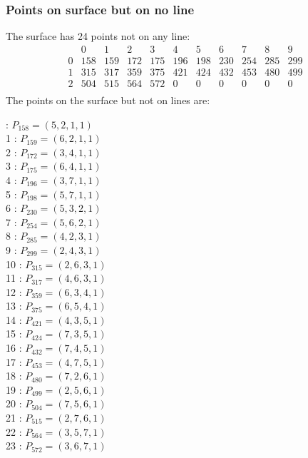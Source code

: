 \documentclass{article}
\begin{document}
{\subsubsection*{Points on surface but on no line}
The surface has 24 points not on any line:\\
$$
\begin{array}{r|*{10}{r}}
 & 0 & 1 & 2 & 3 & 4 & 5 & 6 & 7 & 8 & 9\\
\hline
0 & 158 & 159 & 172 & 175 & 196 & 198 & 230 & 254 & 285 & 299\\
1 & 315 & 317 & 359 & 375 & 421 & 424 & 432 & 453 & 480 & 499\\
2 & 504 & 515 & 564 & 572 & 0 & 0 & 0 & 0 & 0 & 0\\
\end{array}
$$
The points on the surface but not on lines are:\\
\begin{multicols}{2}
 : $P_{158}=( 5, 2, 1, 1 )$\\
1 : $P_{159}=( 6, 2, 1, 1 )$\\
2 : $P_{172}=( 3, 4, 1, 1 )$\\
3 : $P_{175}=( 6, 4, 1, 1 )$\\
4 : $P_{196}=( 3, 7, 1, 1 )$\\
5 : $P_{198}=( 5, 7, 1, 1 )$\\
6 : $P_{230}=( 5, 3, 2, 1 )$\\
7 : $P_{254}=( 5, 6, 2, 1 )$\\
8 : $P_{285}=( 4, 2, 3, 1 )$\\
9 : $P_{299}=( 2, 4, 3, 1 )$\\
10 : $P_{315}=( 2, 6, 3, 1 )$\\
11 : $P_{317}=( 4, 6, 3, 1 )$\\
12 : $P_{359}=( 6, 3, 4, 1 )$\\
13 : $P_{375}=( 6, 5, 4, 1 )$\\
14 : $P_{421}=( 4, 3, 5, 1 )$\\
15 : $P_{424}=( 7, 3, 5, 1 )$\\
16 : $P_{432}=( 7, 4, 5, 1 )$\\
17 : $P_{453}=( 4, 7, 5, 1 )$\\
18 : $P_{480}=( 7, 2, 6, 1 )$\\
19 : $P_{499}=( 2, 5, 6, 1 )$\\
20 : $P_{504}=( 7, 5, 6, 1 )$\\
21 : $P_{515}=( 2, 7, 6, 1 )$\\
22 : $P_{564}=( 3, 5, 7, 1 )$\\
23 : $P_{572}=( 3, 6, 7, 1 )$\\
\end{multicols}
}
\end{document}
